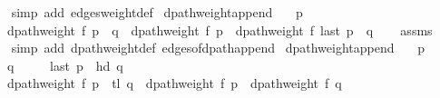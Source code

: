 \begin{isabellebody}
%
\isadelimproof
\ \ %
\endisadelimproof
%
\isatagproof
{}\isamarkupfalse%
\ {\isacharparenleft}{\kern0pt}simp\ add{\isacharcolon}{\kern0pt}\ edges{\isacharunderscore}{\kern0pt}weight{\isacharunderscore}{\kern0pt}def{\isacharparenright}{\kern0pt}%
\endisatagproof
{\isafoldproof}%
%
\isadelimproof
\isanewline
%
\endisadelimproof
\isanewline
{}\isamarkupfalse%
\ dpath{\isacharunderscore}{\kern0pt}weight{\isacharunderscore}{\kern0pt}append{\isacharcolon}{\kern0pt}\isanewline
\ \ \ {\isachardoublequoteopen}p\ {\isasymnoteq}\ {\isacharbrackleft}{\kern0pt}{\isacharbrackright}{\kern0pt}{\isachardoublequoteclose}\isanewline
\ \ \ {\isachardoublequoteopen}dpath{\isacharunderscore}{\kern0pt}weight\ f\ {\isacharparenleft}{\kern0pt}p\ {\isacharat}{\kern0pt}\ q{\isacharparenright}{\kern0pt}\ {\isacharequal}{\kern0pt}\ dpath{\isacharunderscore}{\kern0pt}weight\ f\ p\ {\isacharplus}{\kern0pt}\ dpath{\isacharunderscore}{\kern0pt}weight\ f\ {\isacharparenleft}{\kern0pt}last\ p\ {\isacharhash}{\kern0pt}\ q{\isacharparenright}{\kern0pt}{\isachardoublequoteclose}\isanewline
%
\isadelimproof
\ \ %
\endisadelimproof
%
\isatagproof
{}\isamarkupfalse%
\ assms\isanewline
\ \ \isamarkupfalse%
\ {\isacharparenleft}{\kern0pt}simp\ add{\isacharcolon}{\kern0pt}\ dpath{\isacharunderscore}{\kern0pt}weight{\isacharunderscore}{\kern0pt}def\ edges{\isacharunderscore}{\kern0pt}of{\isacharunderscore}{\kern0pt}dpath{\isacharunderscore}{\kern0pt}append{\isacharunderscore}{\kern0pt}{}{\isacharparenright}{\kern0pt}%
\endisatagproof
{\isafoldproof}%
%
\isadelimproof
\isanewline
%
\endisadelimproof
\isanewline
{}\isamarkupfalse%
\ dpath{\isacharunderscore}{\kern0pt}weight{\isacharunderscore}{\kern0pt}append{\isacharunderscore}{\kern0pt}{}{\isacharcolon}{\kern0pt}\isanewline
\ \ \ {\isachardoublequoteopen}p\ {\isasymnoteq}\ {\isacharbrackleft}{\kern0pt}{\isacharbrackright}{\kern0pt}{\isachardoublequoteclose}\isanewline
\ \ \ {\isachardoublequoteopen}q\ {\isasymnoteq}\ {\isacharbrackleft}{\kern0pt}{\isacharbrackright}{\kern0pt}{\isachardoublequoteclose}\isanewline
\ \ \ {\isachardoublequoteopen}last\ p\ {\isacharequal}{\kern0pt}\ hd\ q{\isachardoublequoteclose}\isanewline
\ \ \ {\isachardoublequoteopen}dpath{\isacharunderscore}{\kern0pt}weight\ f\ {\isacharparenleft}{\kern0pt}p\ {\isacharat}{\kern0pt}\ tl\ q{\isacharparenright}{\kern0pt}\ {\isacharequal}{\kern0pt}\ dpath{\isacharunderscore}{\kern0pt}weight\ f\ p\ {\isacharplus}{\kern0pt}\ dpath{\isacharunderscore}{\kern0pt}weight\ f\ q{\isachardoublequoteclose}\isanewline

\end{isabellebody}
